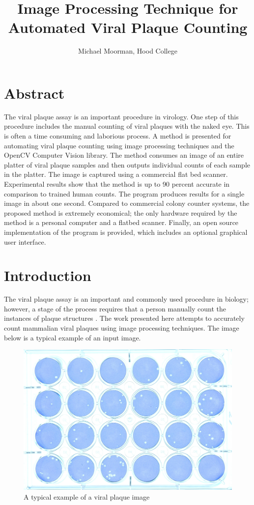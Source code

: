 \documentclass[11pt,final,twocolumn]{IEEEtran}
\begin{document}
\title{Image Processing Technique for Automated Viral Plaque Counting}
\author{Michael Moorman, Hood College}
\maketitle
\section{Abstract}
The viral plaque assay is an important procedure in virology. One step of this procedure includes the manual counting of viral plaques with the naked eye.  This is often a time consuming and laborious process. A method is presented for automating viral plaque counting using image processing techniques and the OpenCV Computer Vision library. The method consumes an image of an entire platter of viral plaque samples and then outputs individual counts of each sample in the platter. The image is captured using a commercial flat bed scanner. Experimental results show that the method is up to 90 percent accurate in comparison to trained human counts. The program produces results for a single image in about one second.  Compared to commercial colony counter systems, the proposed method is extremely economical; the only hardware required by the method is a personal computer and a flatbed scanner.  Finally, an open source implementation of the program is provided, which includes an optional graphical user interface. 



\section{Introduction}
The viral plaque assay is an important and commonly used procedure in biology; however, a stage of the process requires that a person manually count the instances of plaque structures . The work presented here attempts to accurately count mammalian  viral plaques using image processing techniques. The image below is a typical example of an input image.
\begin{figure}[h]
\centering
\includegraphics[width=.4\textwidth]{sample.jpg}
\caption{A typical example of a viral plaque image}
\label{fig:sample}
\end{figure}
\end{document}
